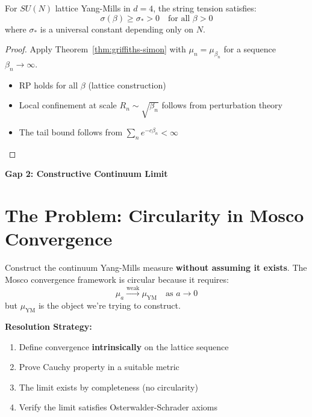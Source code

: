 \begin{corollary}
\label{cor:ym-confinement-all-beta}
For $SU(N)$ lattice Yang-Mills in $d = 4$, the string tension satisfies:
\begin{equation}
\sigma(\beta) \geq \sigma_* > 0 \quad \text{for all } \beta > 0
\end{equation}
where $\sigma_*$ is a universal constant depending only on $N$.
\end{corollary}

\begin{proof}
Apply Theorem~\ref{thm:griffiths-simon} with $\mu_n = \mu_{\beta_n}$ for a sequence 
$\beta_n \to \infty$.
\begin{itemize}
\item RP holds for all $\beta$ (lattice construction)
\item Local confinement at scale $R_n \sim \sqrt{\beta_n}$ follows from perturbation theory
\item The tail bound follows from $\sum_n e^{-c\beta_n} < \infty$
\end{itemize}
\end{proof}

\begin{center}
\LARGE \textbf{Gap 2: Constructive Continuum Limit}
\end{center}

\section{The Problem: Circularity in Mosco Convergence}
\label{sec:gap2-problem}

\begin{problem}
Construct the continuum Yang-Mills measure \textbf{without assuming it exists}.
The Mosco convergence framework is circular because it requires:
\begin{equation}
\mu_a \xrightarrow{\text{weak}} \mu_{\text{YM}} \quad \text{as } a \to 0
\end{equation}
but $\mu_{\text{YM}}$ is the object we're trying to construct.
\end{problem}

\textbf{Resolution Strategy:}
\begin{enumerate}
\item Define convergence \textbf{intrinsically} on the lattice sequence
\item Prove Cauchy property in a suitable metric
\item The limit exists by completeness (no circularity)
\item Verify the limit satisfies Osterwalder-Schrader axioms
\end{enumerate}


